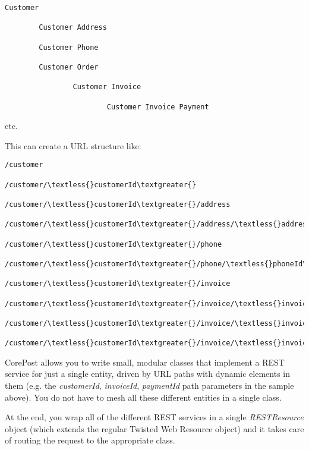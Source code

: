 \documentclass[letterpaper,10pt,english]{sphinxmanual}
\begin{document}
\begin{Verbatim}[commandchars=\\\{\}]
Customer

        Customer Address

        Customer Phone

        Customer Order

                Customer Invoice

                        Customer Invoice Payment
\end{Verbatim}

etc.

This can create a URL structure like:

\begin{Verbatim}[commandchars=\\\{\}]
/customer

/customer/\textless{}customerId\textgreater{}

/customer/\textless{}customerId\textgreater{}/address

/customer/\textless{}customerId\textgreater{}/address/\textless{}addressId\textgreater{}

/customer/\textless{}customerId\textgreater{}/phone

/customer/\textless{}customerId\textgreater{}/phone/\textless{}phoneId\textgreater{}

/customer/\textless{}customerId\textgreater{}/invoice

/customer/\textless{}customerId\textgreater{}/invoice/\textless{}invoiceId\textgreater{}

/customer/\textless{}customerId\textgreater{}/invoice/\textless{}invoiceId\textgreater{}/payment

/customer/\textless{}customerId\textgreater{}/invoice/\textless{}invoiceId\textgreater{}/payment/\textless{}paymentId\textgreater{}
\end{Verbatim}

CorePost allows you to write small, modular classes that implement a REST service for just a single entity,
driven by URL paths with dynamic elements in them (e.g. the \emph{customerId}, \emph{invoiceId}, \emph{paymentId} path parameters in the sample above).
You do not have to mesh all these different entities in a single class.

At the end, you wrap all of the different REST services in a single \emph{RESTResource} object (which extends the regular Twisted Web Resource object)
and it takes care of routing the request to the appropriate class.
\end{document}
